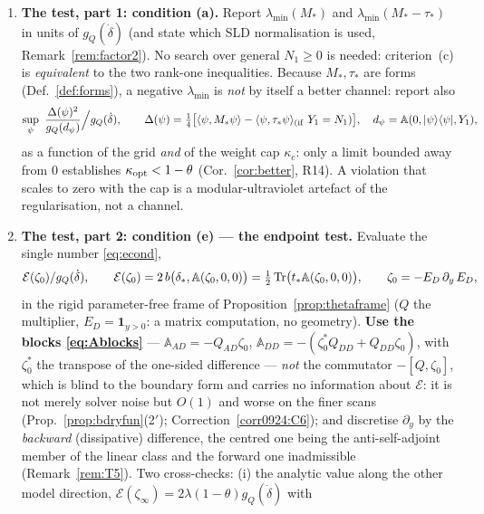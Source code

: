 \documentclass[11pt]{article}
\newcommand{\Herm}{\operatorname{Herm}}
\newcommand{\Aop}{\mathbb A}
\begin{document}
\begin{enumerate}[leftmargin=1.8em,itemsep=2pt]
 $M_*=\Herm(t_{*,DA}Q_{AD})+\Herm(t_{*,DD}Q_{DD})$: the $DA$ block of $t_*$ is needed, not
 only the $DD$ block.
\item \textbf{The test, part 1: condition (a).}  Report $\lambda_{\min}(M_*)$ and
 $\lambda_{\min}(M_*-\tau_*)$ in units of $g_Q(\dot\delta)$ (and state which SLD
 normalisation is used, Remark~\ref{rem:factor2}).  No search over general $N_1\ge0$ is
 needed: criterion~(c) is \emph{equivalent} to the two rank-one inequalities.  Because
 $M_*,\tau_*$ are forms (Def.~\ref{def:forms}), a negative $\lambda_{\min}$ is
 \emph{not} by itself a better channel: report also
 \begin{equation}\label{eq:gainreport}
  \sup_{\psi}\ \frac{\Delta(\psi)^2}{g_Q(d_\psi)}\Big/g_Q(\dot\delta),\qquad
  \Delta(\psi)=\tfrac14\bigl[\langle\psi,M_*\psi\rangle-\langle\psi,\tau_*\psi\rangle_{\rm(if\ }Y_1=N_1)\bigr],
  \quad d_\psi=\Aop(0,|\psi\rangle\langle\psi|,Y_1),
 \end{equation}
 as a function of the grid \emph{and} of the weight cap $\kappa_c$: only a limit bounded
 away from $0$ establishes $\kappa_{\rm opt}<1-\theta$ (Cor.~\ref{cor:better}, R14).  A
 violation that scales to zero with the cap is a modular-ultraviolet artefact of the
 regularisation, not a channel.
\item \textbf{The test, part 2: condition (e) --- the endpoint test.}  Evaluate the single
 number \eqref{eq:econd},
 \[ \mathcal E(\zeta_0)/g_Q(\dot\delta),\qquad
   \mathcal E(\zeta_0)=2\,b\bigl(\delta_*,\Aop(\zeta_0,0,0)\bigr)
   =\tfrac12\Tr\bigl(t_*\Aop(\zeta_0,0,0)\bigr),\qquad \zeta_0=-E_D\,\partial_y\,E_D , \]
 in the rigid parameter-free frame of Proposition~\ref{prop:thetaframe} ($Q$ the multiplier,
 $E_D=\mathbf 1_{y>0}$: a matrix computation, no geometry).  \textbf{Use the blocks
 \eqref{eq:Ablocks}} --- $\Aop_{AD}=-Q_{AD}\zeta_0$,
 $\Aop_{DD}=-(\zeta_0^*Q_{DD}+Q_{DD}\zeta_0)$, with $\zeta_0^*$ the transpose of the
 one-sided difference --- \emph{not} the commutator $-[Q,\zeta_0]$, which is blind to the
 boundary form and carries no information about $\mathcal E$: it is not merely solver noise but $O(1)$ and worse on the finer scans (Prop.~\ref{prop:bdryfun}(2$'$); Correction~\ref{corr0924:C6}); and
 discretise $\partial_y$ by the \emph{backward} (dissipative) difference, the centred one
 being the anti-self-adjoint member of the linear class and the forward one inadmissible
 (Remark~\ref{rem:T5}).  Two cross-checks: (i) the analytic value along the other model
 direction,
 $\mathcal E(\zeta_\infty)=2\lambda(1-\theta)g_Q(\dot\delta)$ with

\end{enumerate}
\end{document}
